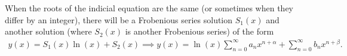 When the roots of the indicial equation are the same (or sometimes when they differ by an integer), there will be a Frobenious series solution $S_1(x)$ and another solution (where $S_2(x)$ is another Frobenious series) of the form
\begin{align}
	y(x) = S_1(x)\ln(x)+S_2(x) \implies y(x) = \ln(x)\sum_{n=0}^{\infty}a_n x^{n+\alpha} +\sum_{n=0}^{\infty}b_n x^{n+\beta}.
\end{align}

